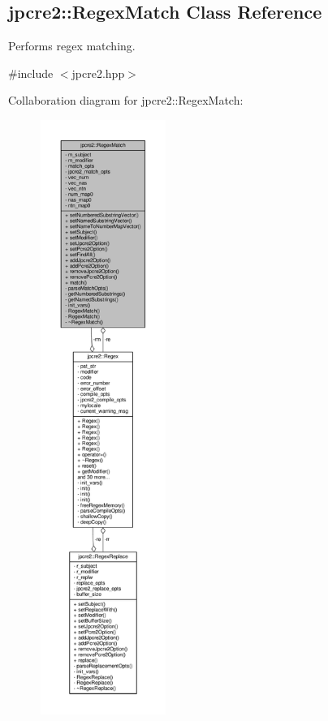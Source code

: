 \hypertarget{classjpcre2_1_1RegexMatch}{}\subsection{jpcre2\+:\+:Regex\+Match Class Reference}
\label{classjpcre2_1_1RegexMatch}


Performs regex matching.  




{\ttfamily \#include $<$jpcre2.\+hpp$>$}



Collaboration diagram for jpcre2\+:\+:Regex\+Match\+:
\nopagebreak
\begin{figure}[H]
\begin{center}
\leavevmode
\includegraphics[height=550pt]{classjpcre2_1_1RegexMatch__coll__graph}
\end{center}
\end{figure}
